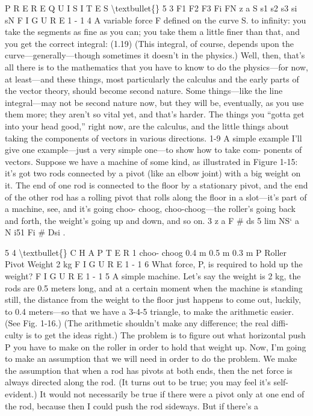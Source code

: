 \documentclass[10pt,oneside]{article}
\begin{document}
P R E R E Q U I S I T E S \textbackslash{}textbullet\{\} 5 3 F1 F2 F3 Fi FN z a S s1 s2 s3 si sN F I G U R E 1 - 1 4 A variable force F defined on the curve S. to infinity: you take the segments as fine as you can; you take them a little finer than that, and you get the correct integral: (1.19) (This integral, of course, depends upon the curve---generally---though sometimes it doesn’t in the physics.) Well, then, that’s all there is to the mathematics that you have to know to do the physics---for now, at least---and these things, most particularly the calculus and the early parts of the vector theory, should become second nature. Some things---like the line integral---may not be second nature now, but they will be, eventually, as you use them more; they aren’t so vital yet, and that’s harder. The things you “gotta get into your head good,” right now, are the calculus, and the little things about taking the components of vectors in various directions. 1-9 A simple example I’ll give one example---just a very simple one---to show how to take com- ponents of vectors. Suppose we have a machine of some kind, as illustrated in Figure 1-15: it’s got two rods connected by a pivot (like an elbow joint) with a big weight on it. The end of one rod is connected to the floor by a stationary pivot, and the end of the other rod has a rolling pivot that rolls along the floor in a slot---it’s part of a machine, see, and it’s going choo- choog, choo-choog---the roller’s going back and forth, the weight’s going up and down, and so on. 3 z a F \# ds 5 lim NS` a N i51 Fi \# Dsi .\par

5 4 \textbackslash{}textbullet\{\} C H A P T E R  1 choo- choog 0.4 m 0.5 m 0.3 m P Roller Pivot Weight 2 kg F I G U R E 1 - 1 6 What force, P, is required to hold up the weight? F I G U R E 1 - 1 5 A simple machine. Let’s say the weight is 2 kg, the rods are 0.5 meters long, and at a certain moment when the machine is standing still, the distance from the weight to the floor just happens to come out, luckily, to 0.4 meters---so that we have a 3-4-5 triangle, to make the arithmetic easier. (See Fig. 1-16.) (The arithmetic shouldn’t make any difference; the real diffi- culty is to get the ideas right.) The problem is to figure out what horizontal push P you have to make on the roller in order to hold that weight up. Now, I’m going to make an assumption that we will need in order to do the problem. We make the assumption that when a rod has pivots at both ends, then the net force is always directed along the rod. (It turns out to be true; you may feel it’s self- evident.) It would not necessarily be true if there were a pivot only at one end of the rod, because then I could push the rod sideways. But if there’s a\par
\end{document}
